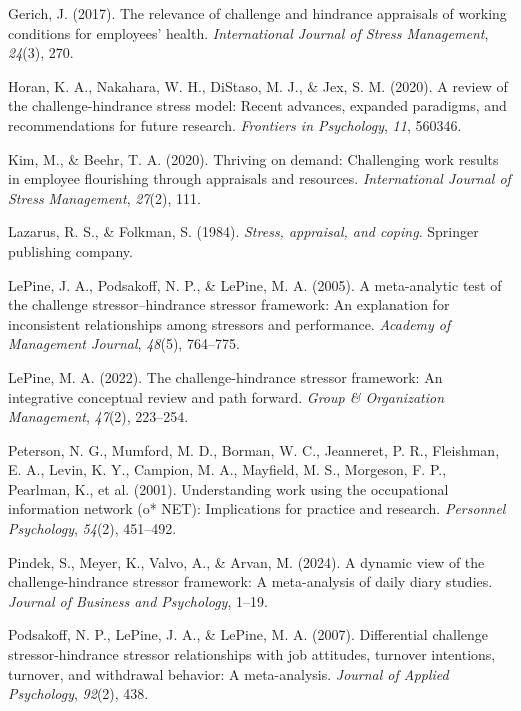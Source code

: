 \documentclass[
  man,mask]{apa7}
\newlength{\cslhangindent}
\newlength{\cslentryspacingunit} %
\newenvironment{CSLReferences}[2] %
 {%
  \setlength{\parindent}{0pt}
  \ifodd #1
  \let\oldpar\par
  \def\par{\hangindent=\cslhangindent\oldpar}
  \fi
  \setlength{\parskip}{#2\cslentryspacingunit}
 }%
 {}
\begin{document}
\begin{CSLReferences}{1}{0}
\leavevmode{}%
Gerich, J. (2017). The relevance of challenge and hindrance appraisals of working conditions for employees' health. \emph{International Journal of Stress Management}, \emph{24}(3), 270.

\leavevmode{}%
Horan, K. A., Nakahara, W. H., DiStaso, M. J., \& Jex, S. M. (2020). A review of the challenge-hindrance stress model: Recent advances, expanded paradigms, and recommendations for future research. \emph{Frontiers in Psychology}, \emph{11}, 560346.

\leavevmode{}%
Kim, M., \& Beehr, T. A. (2020). Thriving on demand: Challenging work results in employee flourishing through appraisals and resources. \emph{International Journal of Stress Management}, \emph{27}(2), 111.

\leavevmode{}%
Lazarus, R. S., \& Folkman, S. (1984). \emph{Stress, appraisal, and coping}. Springer publishing company.

\leavevmode{}%
LePine, J. A., Podsakoff, N. P., \& LePine, M. A. (2005). A meta-analytic test of the challenge stressor--hindrance stressor framework: An explanation for inconsistent relationships among stressors and performance. \emph{Academy of Management Journal}, \emph{48}(5), 764--775.

\leavevmode{}%
LePine, M. A. (2022). The challenge-hindrance stressor framework: An integrative conceptual review and path forward. \emph{Group \& Organization Management}, \emph{47}(2), 223--254.

\leavevmode{}%
Peterson, N. G., Mumford, M. D., Borman, W. C., Jeanneret, P. R., Fleishman, E. A., Levin, K. Y., Campion, M. A., Mayfield, M. S., Morgeson, F. P., Pearlman, K., et al. (2001). Understanding work using the occupational information network (o* NET): Implications for practice and research. \emph{Personnel Psychology}, \emph{54}(2), 451--492.

\leavevmode{}%
Pindek, S., Meyer, K., Valvo, A., \& Arvan, M. (2024). A dynamic view of the challenge-hindrance stressor framework: A meta-analysis of daily diary studies. \emph{Journal of Business and Psychology}, 1--19.

\leavevmode{}%
Podsakoff, N. P., LePine, J. A., \& LePine, M. A. (2007). Differential challenge stressor-hindrance stressor relationships with job attitudes, turnover intentions, turnover, and withdrawal behavior: A meta-analysis. \emph{Journal of Applied Psychology}, \emph{92}(2), 438.


\end{CSLReferences}
\end{document}
